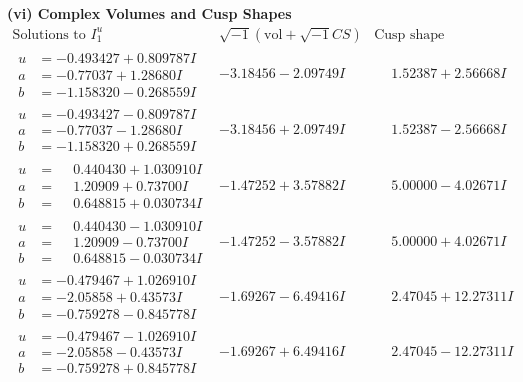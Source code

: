\documentclass[1p]{elsarticle_modified}
\theoremstyle{definition}
\newcommand{\I}{\sqrt{-1}}
\begin{document}
\newpage\flushleft \textbf{(vi) Complex Volumes and Cusp Shapes}
$$\begin{array}{c|c|c}  
\text{Solutions to }I^u_{1}& \I (\text{vol} + \sqrt{-1}CS) & \text{Cusp shape}\\
 \hline 
\begin{aligned}
u &= -0.493427 + 0.809787 I \\
a &= -0.77037 + 1.28680 I \\
b &= -1.158320 - 0.268559 I\end{aligned}
 & -3.18456 - 2.09749 I & \phantom{-}1.52387 + 2.56668 I \\ \hline\begin{aligned}
u &= -0.493427 - 0.809787 I \\
a &= -0.77037 - 1.28680 I \\
b &= -1.158320 + 0.268559 I\end{aligned}
 & -3.18456 + 2.09749 I & \phantom{-}1.52387 - 2.56668 I \\ \hline\begin{aligned}
u &= \phantom{-}0.440430 + 1.030910 I \\
a &= \phantom{-}1.20909 + 0.73700 I \\
b &= \phantom{-}0.648815 + 0.030734 I\end{aligned}
 & -1.47252 + 3.57882 I & \phantom{-}5.00000 - 4.02671 I \\ \hline\begin{aligned}
u &= \phantom{-}0.440430 - 1.030910 I \\
a &= \phantom{-}1.20909 - 0.73700 I \\
b &= \phantom{-}0.648815 - 0.030734 I\end{aligned}
 & -1.47252 - 3.57882 I & \phantom{-}5.00000 + 4.02671 I \\ \hline\begin{aligned}
u &= -0.479467 + 1.026910 I \\
a &= -2.05858 + 0.43573 I \\
b &= -0.759278 - 0.845778 I\end{aligned}
 & -1.69267 - 6.49416 I & \phantom{-}2.47045 + 12.27311 I \\ \hline\begin{aligned}
u &= -0.479467 - 1.026910 I \\
a &= -2.05858 - 0.43573 I \\
b &= -0.759278 + 0.845778 I\end{aligned}
 & -1.69267 + 6.49416 I & \phantom{-}2.47045 - 12.27311 I \\ \hline\begin{aligned}

\end{aligned}
\end{array}$$
\end{document}

